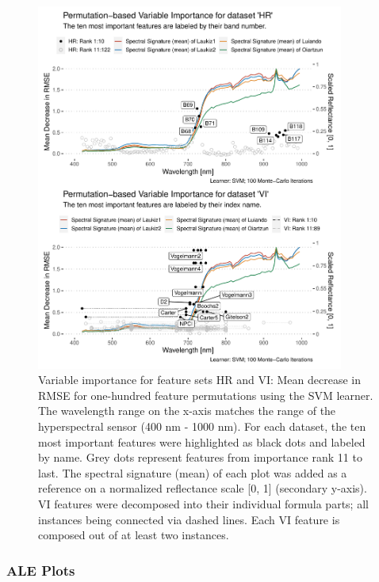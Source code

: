 \documentclass[letterpaper, peerreview, draftcls]{IEEEtran}
\begin{document}
\begin{figure} [ht!]
	\centering
	\begin{center}
		\includegraphics[width=0.9\textwidth] {fi-permut-vi-hr-1.pdf}
		\caption{Variable importance for feature sets HR and VI: Mean decrease in RMSE for one-hundred feature permutations using the SVM learner. The wavelength range on the x-axis matches the range of the hyperspectral sensor (400 nm - 1000 nm). For each dataset, the ten most important features were highlighted as black dots and labeled by name. Grey dots represent features from importance rank 11 to last. The spectral signature (mean) of each plot was added as a reference on a normalized reflectance scale [0, 1] (secondary y-axis). VI features were decomposed into their individual formula parts; all instances being connected via dashed lines. Each VI feature is composed out of at least two instances.}\label{fig:fi-permut-vi-hr}
	\end{center}
\end{figure}

\subsubsection{ALE Plots}
\end{document}
